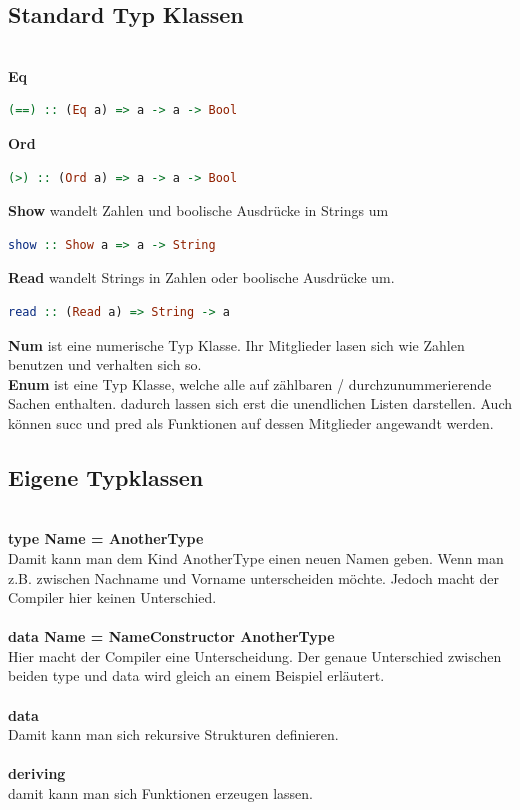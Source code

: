 \subsection{Standard Typ Klassen}\qquad\\
\textbf{Eq} 
\begin{lstlisting}[language=Haskell]  
(==) :: (Eq a) => a -> a -> Bool  
\end{lstlisting}\qquad\newline
\textbf{Ord} 
\begin{lstlisting}[language=Haskell]  
(>) :: (Ord a) => a -> a -> Bool  
\end{lstlisting}\qquad\newline
\textbf{Show} wandelt Zahlen und boolische Ausdrücke in Strings um\
\begin{lstlisting}[language=Haskell]  
show :: Show a => a -> String 
\end{lstlisting}\qquad\newline
\textbf{Read} wandelt Strings in Zahlen oder boolische Ausdrücke um. 
\begin{lstlisting}[language=Haskell]  
read :: (Read a) => String -> a  
\end{lstlisting}\qquad\newline
\textbf{Num} ist eine numerische Typ Klasse. Ihr Mitglieder lasen sich wie Zahlen benutzen und verhalten sich so.\\
\textbf{Enum} ist eine Typ Klasse, welche alle auf zählbaren / durchzunummerierende Sachen enthalten. dadurch lassen sich erst die unendlichen Listen darstellen. Auch können succ und pred als Funktionen auf dessen Mitglieder angewandt werden.  

\subsection{Eigene Typklassen}\qquad\\
\textbf{type Name = AnotherType}\\ Damit kann man dem Kind AnotherType einen neuen Namen geben. Wenn man z.B. zwischen Nachname und Vorname unterscheiden möchte. Jedoch macht der Compiler hier keinen Unterschied. \\\qquad\\
\textbf{data Name = NameConstructor AnotherType}\\ Hier macht der Compiler eine Unterscheidung. Der genaue Unterschied zwischen beiden type und data wird gleich an einem Beispiel erläutert.  \\\qquad\\
\textbf{data} \\ Damit kann man sich rekursive Strukturen definieren.\\\qquad\\
\textbf{deriving}\\ damit kann man sich Funktionen erzeugen lassen. 

